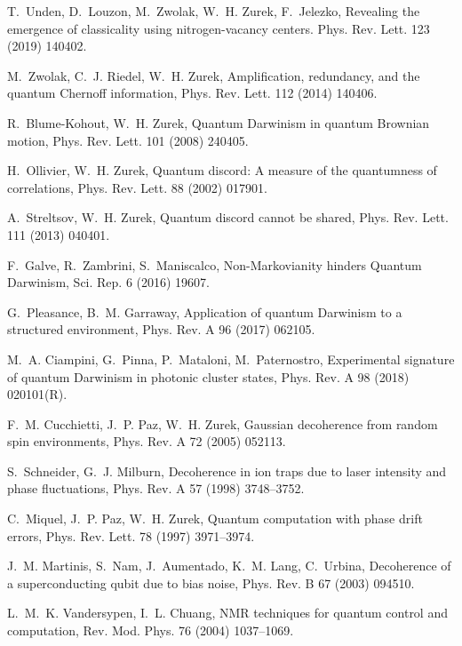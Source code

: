 \documentclass[3p,sort&compress,12pt]{elsarticle}
\begin{document}
\begin{thebibliography}{100}
T.~Unden, D.~Louzon, M.~Zwolak, W.~H. Zurek, F.~Jelezko, Revealing the
  emergence of classicality using nitrogen-vacancy centers. Phys. Rev. Lett. 
123 (2019) 140402. 

M.~Zwolak, C.~J. Riedel, W.~H. Zurek, Amplification, redundancy, and the
  quantum {C}hernoff information, Phys. Rev. Lett. 112 (2014) 140406.

R.~Blume-Kohout, W.~H. Zurek, Quantum {D}arwinism in quantum {B}rownian motion,
  Phys. Rev. Lett. 101 (2008) 240405.

H.~Ollivier, W.~H. Zurek, Quantum discord: {A} measure of the quantumness of
  correlations, Phys. Rev. Lett. 88 (2002) 017901.

A.~Streltsov, W.~H. Zurek, Quantum discord cannot be shared, Phys. Rev. Lett.
  111 (2013) 040401.

F.~Galve, R.~Zambrini, S.~Maniscalco, Non-{M}arkovianity hinders {Q}uantum
  {D}arwinism, Sci. Rep. 6 (2016) 19607.

G.~Pleasance, B.~M. Garraway, Application of quantum {D}arwinism to a
  structured environment, Phys. Rev. A 96 (2017) 062105.

M.~A. Ciampini, G.~Pinna, P.~Mataloni, M.~Paternostro, Experimental signature
  of quantum {D}arwinism in photonic cluster states, Phys. Rev. A 98 (2018)
  020101(R).

F.~M. Cucchietti, J.~P. Paz, W.~H. Zurek, Gaussian decoherence from random spin
  environments, Phys. Rev. A 72 (2005) 052113.

S.~Schneider, G.~J. Milburn, Decoherence in ion traps due to laser intensity
  and phase fluctuations, Phys. Rev. A 57 (1998) 3748--3752.

C.~Miquel, J.~P. Paz, W.~H. Zurek, Quantum computation with phase drift errors,
  Phys. Rev. Lett. 78 (1997) 3971--3974.

J.~M. Martinis, S.~Nam, J.~Aumentado, K.~M. Lang, C.~Urbina, Decoherence of a
  superconducting qubit due to bias noise, Phys. Rev. B 67 (2003) 094510.

L.~M.~K. Vandersypen, I.~L. Chuang, {NMR} techniques for quantum control and
  computation, Rev. Mod. Phys. 76 (2004) 1037--1069.


\end{thebibliography}
\end{document}
